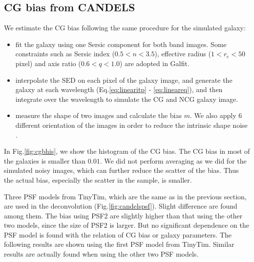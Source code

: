 \documentclass[useAMS,usenatbib]{mn2e}
\begin{document}
\subsection{CG bias from CANDELS}
We estimate the CG bias following the same procedure for the simulated galaxy:
\begin{itemize}
  \item
    fit the galaxy using one Sersic component for both band
    images. Some constraints such as Sersic index ($0.5<n<3.5$),
    effective radius ($1<r_e<50$ pixel) and axis ratio ($0.6<q<1.0$)
    are adopted in Galfit.
  \item
    interpolate the SED on each pixel of the galaxy image, and
    generate the galaxy at each wavelength (Eq.\ref{eq:linearitp} -
    \ref{eq:lineareq}), and then integrate over the wavelength to
    simulate the CG and NCG galaxy image.
  \item
    measure the shape of two images and calculate the bias $m$. We
    also apply $6$ different orientation of the images in order
    to reduce the intrinsic shape noise \citep{2007AJ....133.1763N}.
\end{itemize}
%
In Fig.\ref{fig:cgbhis}, we show the histogram of the CG bias. The CG
bias in most of the galaxies is smaller than $0.01$.  We did not
perform averaging as we did for the simulated noisy images, which can
further reduce the scatter of the bias. Thus the actual bias,
especially the scatter in the sample, is smaller.

Three PSF models from TinyTim, which are the same as in the previous section,
are used in the deconvolution (Fig.\ref{fig:candelspsf}). Slight
difference are found among them. The bias using PSF2 are slightly
higher than that using the other two models, since the size of PSF2 is
larger. But no significant dependence on the PSF model is found with
the relation of CG bias or galaxy parameters. The following results
are shown using the first PSF model from TinyTim. Similar results are
actually found when using the other two PSF models.
%
\end{document}
